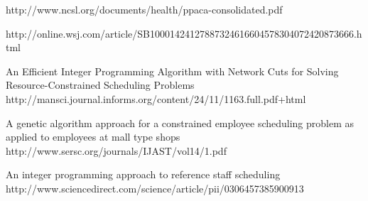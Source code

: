 \begin{thebibliography}{99} %


 http://www.ncsl.org/documents/health/ppaca-consolidated.pdf

   http://online.wsj.com/article/SB10001424127887324616604578304072420873666.html

 An Efficient Integer Programming Algorithm with Network Cuts for Solving Resource-Constrained Scheduling Problems http://mansci.journal.informs.org/content/24/11/1163.full.pdf+html



A genetic algorithm approach for a constrained employee scheduling problem as applied to employees at mall type shops http://www.sersc.org/journals/IJAST/vol14/1.pdf

 An integer programming approach to reference staff scheduling http://www.sciencedirect.com/science/article/pii/0306457385900913

\end{thebibliography}